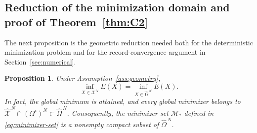 \documentclass[11pt]{article}
\def\Mc{{\mathcal M}}
\def\Xc{{\mathcal X}}
\def\hOm{\widehat{\Omega}^{\,N}}
\def\hX{\widehat{\Xc}^{\,N}}
\newtheorem{proposition}[theorem]{Proposition}
\theoremstyle{definition}
\theoremstyle{remark}
\numberwithin{equation}{section}
\begin{document}
\subsection{Reduction of the minimization domain and proof of Theorem~\ref{thm:C2}}

The next proposition is the geometric reduction needed both for the deterministic minimization
problem and for the record-convergence argument in Section~\ref{sec:numerical}.
\begin{proposition}\label{prop:reduction}
Under Assumption~\ref{ass:geometry},
\begin{equation}\label{eq:reduction}
 \inf_{X\in\Xc^N}E(X)=\inf_{X\in\hOm}E(X).
\end{equation}
In fact, the global minimum is attained, and every global minimizer belongs to $\hX\cap(\Omega^\circ)^N\subset\hOm$.
Consequently, the minimizer set $\Mc_*$ defined in
\eqref{eq:minimizer-set} is a nonempty compact subset of $\hOm$.
\end{proposition}
\end{document}

